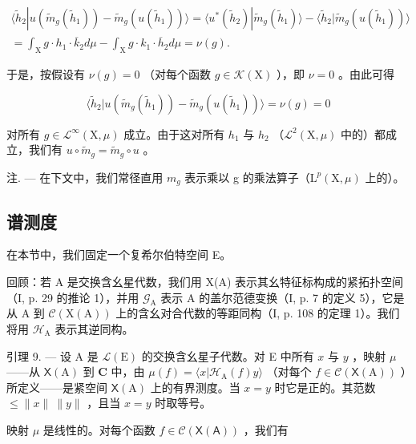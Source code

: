 \[
\begin{array}{c} \langle \widetilde {h} _ {2} | u (\widetilde {m} _ {g} (\widetilde {h} _ {1})) - \widetilde {m} _ {g} (u (\widetilde {h} _ {1})) \rangle = \langle u ^ {*} (\widetilde {h} _ {2}) | \widetilde {m} _ {g} (\widetilde {h} _ {1}) \rangle - \langle \widetilde {h} _ {2} | \widetilde {m} _ {g} (u (\widetilde {h} _ {1})) \rangle \\ = \int_ {\mathrm{X}} g \cdot h _ {1} \cdot \overline {{k}} _ {2} d \mu - \int_ {\mathrm{X}} g \cdot k _ {1} \cdot \overline {{h}} _ {2} d \mu = \nu (g). \end{array}
\]

于是，按假设有 \(\nu(g) = 0\) （对每个函数 \(g \in \mathcal{K}(\mathrm{X})\) ），即 \(\nu = 0\) 。由此可得

\[
\langle \widetilde {h} _ {2} | u (\widetilde {m} _ {g} (\widetilde {h} _ {1})) - \widetilde {m} _ {g} (u (\widetilde {h} _ {1})) \rangle = \nu (g) = 0
\]

对所有 \(g \in \mathcal{L}^{\infty}(\mathrm{X},\mu)\) 成立。由于这对所有 \(h_1\) 与 \(h_2\) （\(\mathcal{L}^2 (\mathrm{X},\mu)\) 中的）都成立，我们有 \(u\circ \widetilde{m}_g = \widetilde{m}_g\circ u\) 。

注. --- 在下文中，我们常径直用 \(m_{g}\) 表示乘以 g 的乘法算子（\(\mathrm{L}^{p}(\mathrm{X},\mu)\) 上的）。

\subsection{谱测度}

在本节中，我们固定一个复希尔伯特空间 E。

回顾：若 A 是交换含幺星代数，我们用 X(A) 表示其幺特征标构成的紧拓扑空间（I, p. 29 的推论 1），并用 \(\mathcal{G}_{\mathrm{A}}\) 表示 A 的盖尔范德变换（I, p. 7 的定义 5），它是从 A 到 \(\mathcal{C}(\mathrm{X}(\mathrm{A}))\) 上的含幺对合代数的等距同构（I, p. 108 的定理 1）。我们将用 \(\mathcal{H}_{\mathrm{A}}\) 表示其逆同构。

引理 9. --- 设 A 是 \(\mathcal{L}(\mathrm{E})\) 的交换含幺星子代数。对 E 中所有 \(x\) 与 \(y\) ，映射 \(\mu\) ——从 \(\mathsf{X}(\mathrm{A})\) 到 \(\mathbf{C}\) 中，由 \(\mu(f) = \langle x | \mathcal{H}_{\mathrm{A}}(f)y \rangle\) （对每个 \(f \in \mathcal{C}(\mathsf{X}(\mathrm{A}))\) ）所定义——是紧空间 \(\mathsf{X}(\mathrm{A})\) 上的有界测度。当 \(x = y\) 时它是正的。其范数 \(\leqslant \|x\|\ \|y\|\) ，且当 \(x = y\) 时取等号。

映射 \(\mu\) 是线性的。对每个函数 \(f\in\mathcal{C}(\mathsf{X}(\mathsf{A}))\) ，我们有

